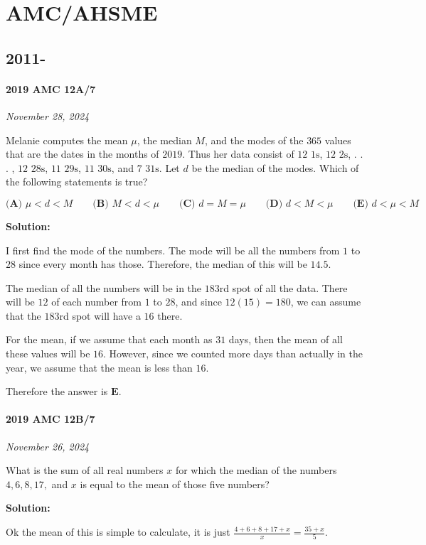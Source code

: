 \documentclass[../mathproblems.tex]{subfiles}
\begin{document}
\chapter{AMC/AHSME}
\section{2011-}
\subsubsection*{2019 AMC 12A/7} 
\textit{November 28, 2024}

Melanie computes the mean $\mu$, the median $M$, and the modes of the $365$ values that are the dates in the months of $2019$. Thus her data consist of $12$ $1\text{s}$, $12$ $2\text{s}$, . . . , $12$ $28\text{s}$, $11$ $29\text{s}$, $11$ $30\text{s}$, and $7$ $31\text{s}$. Let $d$ be the median of the modes. Which of the following statements is true?

$\textbf{(A) } \mu < d < M \qquad\textbf{(B) } M < d < \mu \qquad\textbf{(C) } d = M =\mu \qquad\textbf{(D) } d < M < \mu \qquad\textbf{(E) } d < \mu < M$

\textbf{Solution:}

I first find the mode of the numbers. The mode will be all the numbers from $1$ to $28$ since every month has those. Therefore, the median of this will be $14.5$.

The median of all the numbers will be in the $183$rd spot of all the data. There will be $12$ of each number from $1$ to $28$, and since $12(15) = 180$, we can assume that the $183$rd spot will have a $16$ there.

For the mean, if we assume that each month as $31$ days, then the mean of all these values will be $16$. However, since we counted more days than actually in the year, we assume that the mean is less than $16$.

Therefore the answer is $\boxed{\textbf{E}}$.

\noindent\hrulefill
\subsubsection*{2019 AMC 12B/7} 
\textit{November 26, 2024}

What is the sum of all real numbers $x$ for which the median of the numbers $4,6,8,17,$ and $x$ is equal to the mean of those five numbers?

\textbf{Solution:}

Ok the mean of this is simple to calculate, it is just $\frac{4+6+8+17+x}{x} = \frac{35+x}{5}$.
\end{document}
